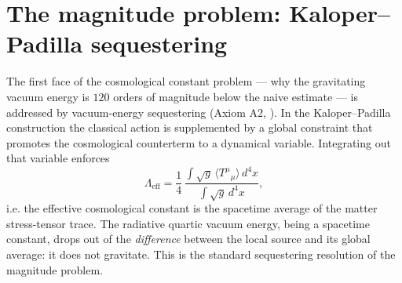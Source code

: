 \documentclass[11pt,a4paper]{article}
\theoremstyle{plain}
\theoremstyle{definition}
\theoremstyle{remark}
\newcommand{\avg}[1]{\langle #1 \rangle}
\begin{document}
\section{The magnitude problem: Kaloper--Padilla sequestering}
\label{sec:sequester}

The first face of the cosmological constant problem --- why the gravitating vacuum energy is
$120$ orders of magnitude below the naive estimate --- is addressed by vacuum-energy
sequestering (Axiom A2, \cite{KP2014,BD2015}). In the Kaloper--Padilla construction the
classical action is supplemented by a global constraint that promotes the cosmological counterterm
to a dynamical variable. Integrating out that variable enforces
\begin{equation}
\label{eq:sequester}
\Lambda_{\mathrm{eff}} = \frac{1}{4}\,\frac{\int \sqrt{g}\,\avg{T^\mu{}_\mu}\,d^4x}{\int \sqrt{g}\,d^4x},
\end{equation}
i.e. the effective cosmological constant is the spacetime average of the matter stress-tensor
trace. The radiative quartic vacuum energy, being a spacetime constant, drops out of the
\emph{difference} between the local source and its global average: it does not gravitate. This
is the standard sequestering resolution of the magnitude problem.
\end{document}
